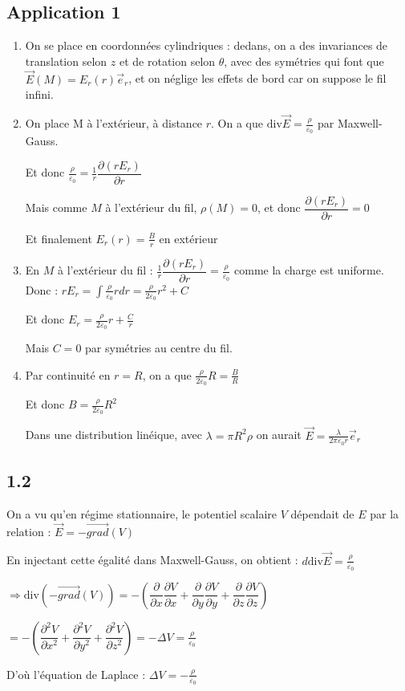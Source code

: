 \documentclass[a4paper,12pt]{book}
\begin{document}
\subsection{Application 1}
\begin{enumerate}
\item On se place en coordonnées cylindriques : dedans, on a des invariances de translation selon $z$ et de rotation selon $\theta$, avec des symétries qui font que $\vec{E}(M)=E_r(r)\vec{e}_r$, et on néglige les effets de bord car on suppose le fil infini.
\item On place M à l'extérieur, à distance $r$. On a que $\mathrm{div}\vec{E}=\frac{\rho}{\varepsilon_0}$ par Maxwell-Gauss. \par Et donc $\frac{\rho}{\varepsilon_0}=\frac{1}{r}\dfrac{\partial (rE_r)}{\partial r}$ \par Mais comme $M$ à l'extérieur du fil, $\rho(M)=0$, et donc $\dfrac{\partial(rE_r)}{\partial r}=0$ \par Et finalement $E_r(r)=\frac{B}{r}$ en extérieur
\item En $M$ à l'extérieur du fil : $\frac{1}{r}\dfrac{\partial (rE_r)}{\partial r}=\frac{\rho}{\varepsilon_0}$ comme la charge est uniforme. Donc : $rE_r=\int\frac{\rho}{\varepsilon_0}rdr=\frac{\rho}{2\varepsilon_0}r^2+C$ \par Et donc $E_r=\frac{\rho}{2\varepsilon_0}r+\frac{C}{r}$ \par Mais $C=0$ par symétries au centre du fil.
\item Par continuité en $r=R$, on a que $\frac{\rho}{2\varepsilon_0}R=\frac{B}{R}$ \par Et donc $B=\frac{\rho}{2\varepsilon_0}R^2$ \par Dans une distribution linéique, avec $\lambda=\pi R^2\rho$ on aurait $\vec{E}=\frac{\lambda}{2\pi\varepsilon_0r}\vec{e}_r$
\end{enumerate}

\subsection{1.2}
On a vu qu'en régime stationnaire, le potentiel scalaire $V$ dépendait de $E$ par la relation : $\vec{E}=-\vec{grad}(V)$
\par En injectant cette égalité dans Maxwell-Gauss, on obtient : $d\mathrm{div}\vec{E}=\frac{\rho}{\varepsilon_0}$ \par $\Rightarrow \mathrm{div}(-\vec{grad}(V))=-\left(\dfrac{\partial}{\partial x}\dfrac{\partial V}{\partial x}+\dfrac{\partial}{\partial y}\dfrac{\partial V}{\partial y}+\dfrac{\partial}{\partial z}\dfrac{\partial V}{\partial z}\right)$
\par $=-\left(\dfrac{\partial^2V}{\partial x^2}+\dfrac{\partial^2V}{\partial y^2}+\dfrac{\partial^2V}{\partial z^2}\right)=-\Delta V=\frac{\rho}{\varepsilon_0}$
\par D'où l'équation de Laplace : $\Delta V = -\frac{\rho}{\varepsilon_0}$
\end{document}
